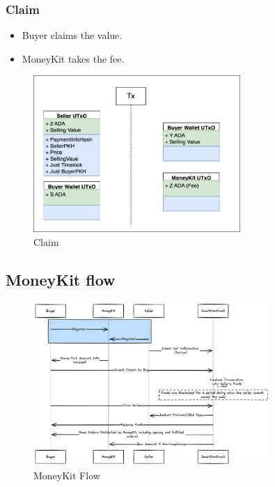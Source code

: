 \documentclass[11pt,oneside,a4paper]{article}
\begin{document}
\subsubsection{Claim}

\begin{itemize}
  \item Buyer claims the value.
  \item MoneyKit takes the fee.
\end{itemize}

\begin{figure}[H]
  \centering
  \includegraphics[width=0.7\textwidth]{img/claim.png}
  \caption{Claim}
  \label{fig:claim}
\end{figure}

\subsection{MoneyKit flow}
\begin{figure}[H]
  \centering
  \includegraphics[width=0.8\textwidth]{img/money_kit.png}
  \caption{MoneyKit Flow}
  \label{fig:money_kit_flow}
\end{figure}
\end{document}
